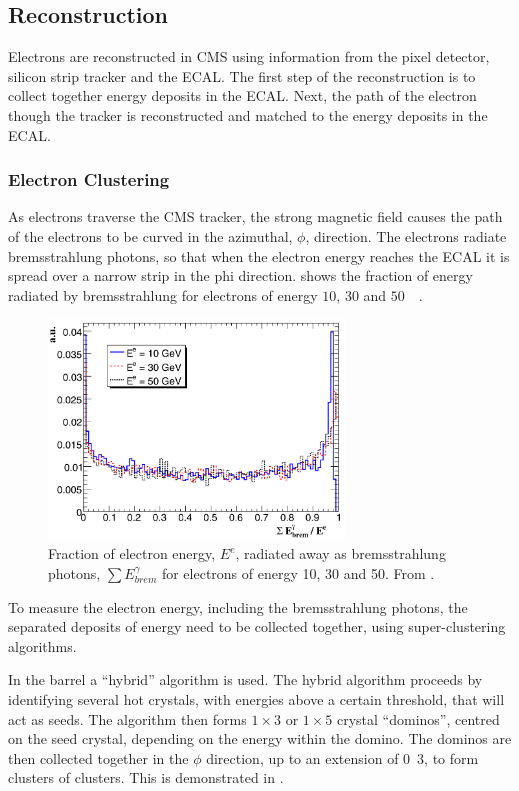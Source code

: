 \subsection{Reconstruction}
Electrons are reconstructed in CMS using information from the pixel detector,
silicon strip tracker and the ECAL.
The first step of the reconstruction is to collect together energy deposits in
the ECAL. Next, the path of the electron though the tracker is reconstructed and
matched to the energy deposits in the ECAL.

\subsubsection{Electron Clustering}
As electrons traverse the CMS tracker, the strong magnetic field causes the path
of the electrons to be curved in the azimuthal, $\phi$, direction. The electrons
radiate bremsstrahlung photons, so that when the electron energy reaches the
ECAL it is spread over a narrow strip in the phi direction.
 shows the fraction of energy radiated by bremsstrahlung for
electrons of energy $10$, $30$ and \unit{$50$}{\GeV} \cite{eReco}.

\begin{figure}[htb]
  \centering
  \includegraphics[width=0.7\textwidth]{brem}
  \caption{Fraction of electron energy, $E^{e}$, radiated away as bremsstrahlung
photons, $\sum E_{brem}^{\gamma}$ for electrons of energy 10, 30 and
\unit{50}{\GeV}. From \cite{eReco}.}
\label{fig:brem}
\end{figure}

To measure the electron energy, including the bremsstrahlung photons, the
separated deposits of energy need to be collected together, using super-clustering
algorithms. 

In the barrel a ``hybrid'' algorithm is used. The hybrid algorithm proceeds by
identifying several hot crystals, with energies above a certain threshold, that
will act as seeds. The algorithm then forms $1\times3$ or $1\times5$ crystal
``dominos'', centred on the seed crystal, depending on the energy within the
domino. The dominos are then collected together in the $\phi$ direction, up to
an extension of \unit{0.3}{\rad}, to form clusters of clusters. This is
demonstrated in  \cite{eECAL}.

